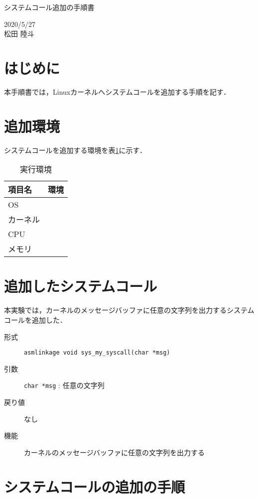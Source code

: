 \documentclass[12pt]{jsarticle}
\begin{document}
\begin{center}
{\LARGE システムコール追加の手順書}
\end{center}

\begin{flushright}
  2020/5/27\\
  松田 陸斗
\end{flushright}
\section{はじめに}
\label{sec:introduction}
本手順書では，Linuxカーネルへシステムコールを追加する手順を記す．

\section{追加環境}
システムコールを追加する環境を表\ref{env}に示す．

\begin{table}[h]
\begin{center}
	\caption{実行環境}\label{env}
	\begin{tabular}{l|l}
	\hline\hline
	\multicolumn{1}{l|}{項目名} & \multicolumn{1}{l}{環境}\\
	\hline
	OS & \\
	カーネル & \\
	CPU & \\
	メモリ & \\
	\hline
	\end{tabular}
\end{center}
\end{table}
\section{追加したシステムコール}
本実験では，カーネルのメッセージバッファに任意の文字列を出力するシステムコールを追加した．
\begin{description}
	\item[形式] \verb|asmlinkage void sys_my_syscall(char *msg)|
	\item[引数] \verb|char *msg| : 任意の文字列
	\item[戻り値] なし
	\item[機能] カーネルのメッセージバッファに任意の文字列を出力する
\end{description}
\section{システムコールの追加の手順}
\end{document}
